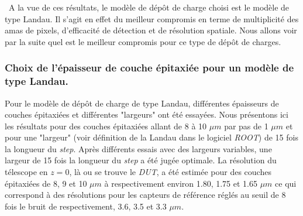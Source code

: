    
   \medskip  
    
   \ A la vue de ces r\'esultats, le mod\`ele de d\'epôt de charge choisi est le mod\`ele de type Landau. Il s'agit en effet du meilleur compromis en terme de multiplicit\'e des amas de pixels, d'efficacit\'e de d\'etection et de r\'esolution spatiale. Nous allons voir par la suite quel est le meilleur compromis pour ce type de d\'epôt de charges.
   
   \subsubsection{Choix de l'\'epaisseur de couche épitaxiée pour un mod\`ele de type Landau.}
   
   Pour le mod\`ele de d\'epôt de charge de type Landau, diff\'erentes \'epaisseurs de couches épitaxiées et diff\'erentes "largeurs" ont \'et\'e essayées. Nous pr\'esentons ici les r\'esultats pour des couches épitaxiées allant de 8 \`a 10 $\mu m$ par pas de 1 $\mu m$ et pour une "largeur" (voir d\'efinition de la Landau dans le logiciel \textit{ROOT}) de 15 fois la longueur du \textit{step}. Apr\`es diff\'erents essais avec des largeurs variables, une largeur de 15 fois la longueur du \textit{step} a \'et\'e jug\'ee optimale. La r\'esolution du télescope en $z=0$, l\`a ou se trouve le \textit{DUT}, a \'et\'e estim\'ee pour des couches épitaxiées de 8, 9 et 10 $\mu m$ \`a respectivement environ 1.80, 1.75 et 1.65 $\mu m$ ce qui correspond \`a des r\'esolutions pour les capteurs de r\'ef\'erence r\'egl\'es au seuil de 8 fois le bruit de respectivement, 3.6, 3.5 et 3.3 $\mu m$.


